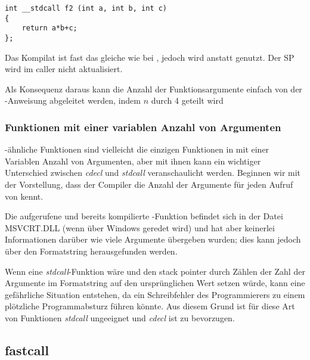 \begin{lstlisting}
int __stdcall f2 (int a, int b, int c)
{
	return a*b+c;
};
\end{lstlisting}

Das Kompilat ist fast das gleiche wie bei ,
jedoch wird  anstatt  genutzt. Der \ac{SP} wird im \gls{caller} nicht
aktualisiert.

Als Konsequenz daraus kann die Anzahl der Funktionsargumente einfach von der -Anweisung
abgeleitet werden, indem $n$ durch 4 geteilt wird

%


\subsubsection{Funktionen mit einer variablen Anzahl von Argumenten}

\printf-ähnliche Funktionen sind vielleicht die einzigen Funktionen in \CCpp mit einer Variablen
Anzahl von Argumenten, aber mit ihnen kann ein wichtiger Unterschied zwischen \emph{cdecl} und
\emph{stdcall} veranschaulicht werden.
Beginnen wir mit der Vorstellung, dass der Compiler die Anzahl der Argumente für jeden Aufruf
von \printf kennt.

Die aufgerufene und bereits kompilierte \printf-Funktion befindet sich in der Datei MSVCRT.DLL
(wenn über Windows geredet wird) und hat aber keinerlei Informationen darüber wie viele Argumente
übergeben wurden; dies kann jedoch über den Formatstring herausgefunden werden.

Wenn \printf eine \emph{stdcall}-Funktion wäre und den \gls{stack pointer} durch Zählen der Zahl
der Argumente im Formatstring auf den ursprünglichen Wert setzen würde, kann eine gefährliche
Situation entstehen, da ein Schreibfehler des Programmierers zu einem plötzliche Programmabsturz
führen könnte.
Aus diesem Grund ist für diese Art von Funktionen \emph{stdcall} ungeeignet und \emph{cdecl} ist
zu bevorzugen.

\subsection{fastcall}
\label{fastcall}

